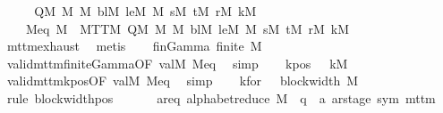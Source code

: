 \begin{isabellebody}
%
\isadelimproof
%
\endisadelimproof
%
\isatagproof
{}\isamarkupfalse%
\ {\isacharminus}{\kern0pt}\isanewline
\ \ \isamarkupfalse%
\ Q\isactrlsub M\ {\isasymSigma}\isactrlsub M\ {\isasymGamma}\isactrlsub M\ bl\isactrlsub M\ le\isactrlsub M\ {\isasymdelta}\isactrlsub M\ s\isactrlsub M\ t\isactrlsub M\ r\isactrlsub M\ k\isactrlsub M\ \isanewline
\ \ \ \ M{\isacharunderscore}{\kern0pt}eq{\isacharcolon}{\kern0pt}\ {\isachardoublequoteopen}M\ {\isacharequal}{\kern0pt}\ MTTM\ Q\isactrlsub M\ {\isasymSigma}\isactrlsub M\ {\isasymGamma}\isactrlsub M\ bl\isactrlsub M\ le\isactrlsub M\ {\isasymdelta}\isactrlsub M\ s\isactrlsub M\ t\isactrlsub M\ r\isactrlsub M\ k\isactrlsub M{\isachardoublequoteclose}\isanewline
\ \ \ \ \isamarkupfalse%
\ mttm{\isachardot}{\kern0pt}exhaust\ \isamarkupfalse%
\ metis\isanewline
\isanewline
\ \ \isamarkupfalse%
\ fin{\isacharunderscore}{\kern0pt}Gamma{\isacharcolon}{\kern0pt}\ {\isachardoublequoteopen}finite\ {\isasymGamma}\isactrlsub M{\isachardoublequoteclose}\isanewline
\ \ \ \ \isamarkupfalse%
\ valid{\isacharunderscore}{\kern0pt}mttm{\isacharunderscore}{\kern0pt}finite{\isacharunderscore}{\kern0pt}Gamma{\isacharbrackleft}{\kern0pt}OF\ valM{\isacharbrackright}{\kern0pt}\ M{\isacharunderscore}{\kern0pt}eq\ \isamarkupfalse%
\ simp\isanewline
\ \ \isamarkupfalse%
\ kpos{\isacharcolon}{\kern0pt}\ {\isachardoublequoteopen}{}\ {\isacharless}{\kern0pt}\ k\isactrlsub M{\isachardoublequoteclose}\isanewline
\ \ \ \ \isamarkupfalse%
\ valid{\isacharunderscore}{\kern0pt}mttm{\isacharunderscore}{\kern0pt}k{\isacharunderscore}{\kern0pt}pos{\isacharbrackleft}{\kern0pt}OF\ valM{\isacharbrackright}{\kern0pt}\ M{\isacharunderscore}{\kern0pt}eq\ \isamarkupfalse%
\ simp\isanewline
\ \ \isamarkupfalse%
\ kfor{}{\isacharcolon}{\kern0pt}\ {\isachardoublequoteopen}{}\ {\isasymle}\ block{\isacharunderscore}{\kern0pt}width\ {\isasymGamma}\isactrlsub M{\isachardoublequoteclose}\ \isamarkupfalse%
\ {\isacharparenleft}{\kern0pt}rule\ block{\isacharunderscore}{\kern0pt}width{\isacharunderscore}{\kern0pt}pos{\isacharparenright}{\kern0pt}\isanewline
\isanewline
\ \ %
\isanewline
\ \ \isamarkupfalse%
\ ar{\isacharunderscore}{\kern0pt}eq{\isacharcolon}{\kern0pt}\ {\isachardoublequoteopen}{\isacharparenleft}{\kern0pt}alphabet{\isacharunderscore}{\kern0pt}reduce\ M\ {\isacharcolon}{\kern0pt}{\isacharcolon}{\kern0pt}\ {\isacharparenleft}{\kern0pt}{\isacharprime}{\kern0pt}q\ {\isasymtimes}\ {\isacharprime}{\kern0pt}a\ ar{\isacharunderscore}{\kern0pt}stage{\isacharcomma}{\kern0pt}\ sym{}{\isacharparenright}{\kern0pt}\ mttm{\isacharparenright}{\kern0pt}\ {\isacharequal}{\kern0pt}\isanewline

\end{isabellebody}
